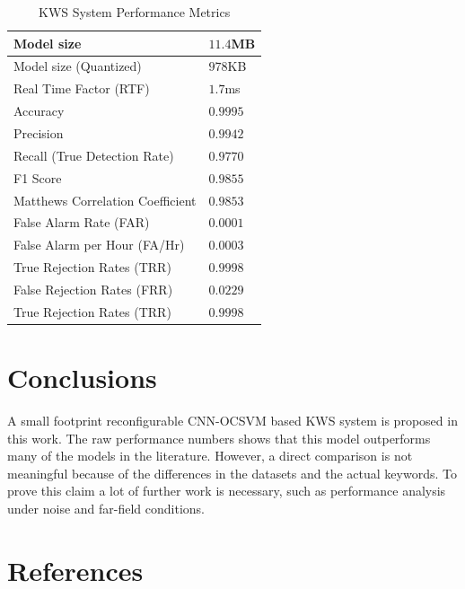 \documentclass[a4paper]{article}
\begin{document}
 
\begin{table}[h]
  \caption{KWS System Performance Metrics}
  \label{tab:KWS}
  \centering
  \begin{tabular}{|M{4.5cm}|M{2.5cm}|}
    \hline
    Model size 		 					& $11.4$MB            \\ \hline
    Model size (Quantized) 				& $978$KB             \\ \hline
	Real Time Factor (RTF)			 	& $1.7$ms             \\ \hline
	Accuracy 		 					& $0.9995$            \\ \hline
	Precision			 				& $0.9942$            \\ \hline
	Recall (True Detection Rate) 		& $0.9770$            \\ \hline
	F1 Score			 				& $0.9855$            \\ \hline
	Matthews Correlation Coefficient 	& $0.9853$            \\ \hline
	False Alarm Rate (FAR)			 	& $0.0001$            \\ \hline
	False Alarm per Hour (FA/Hr)		& $0.0003$            \\ \hline
	True Rejection Rates (TRR)		 	& $0.9998$            \\ \hline
	False Rejection Rates (FRR)			& $0.0229$            \\ \hline
	True Rejection Rates (TRR)		 	& $0.9998$            \\ \hline

    \hline
  \end{tabular}
\end{table}


\section{Conclusions}

A small footprint reconfigurable CNN-OCSVM based KWS system is proposed in this work. The raw performance numbers shows that this model outperforms many of the models in the literature. However, a direct comparison is not meaningful because of the differences in the datasets and the actual keywords. To prove this claim a lot of further work is necessary, such as performance analysis under noise and far-field conditions.

\section{References}
\printbibliography[heading=none]
\end{document}
